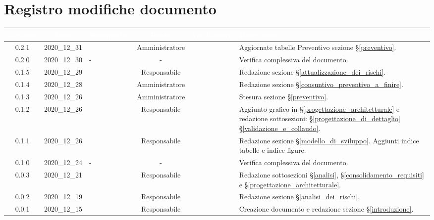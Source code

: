 \section*{Registro modifiche documento}
{

     
\renewcommand{\arraystretch}{1.5}
\centering
\begin{longtable}{c c C{3cm} c c C{3cm}}


 \textcolor{white}{\textbf{Versione}}&
    \textcolor{white}{\textbf{Data}}&
    \textcolor{white}{\textbf{Nominativo}}&
    \textcolor{white}{\textbf{Ruolo}}&
    \textcolor{white}{\textbf{Verificatore}}&
    \textcolor{white}{\textbf{Descrizione}}\\	
    \endhead

	0.2.1 & 2020\_12\_31 & \TG{} & Amministratore & \PC{} & Aggiornate tabelle Preventivo sezione \S\ref{preventivo}.\\
 
	0.2.0 & 2020\_12\_30 &  -  & - &  \TG{} & Verifica complessiva del documento.\\

    0.1.5 & 2020\_12\_29 & \MM{} & Responsabile & \TG{} & Redazione sezione \S\ref{attualizzazione_dei_rischi}. \\

    0.1.4 & 2020\_12\_28 & \PC{} & Amministratore & \TG{} &  Redazione sezione \S\ref{consuntivo_preventivo_a_finire}. \\

    0.1.3 & 2020\_12\_26 & \PC{} & Amministratore & \TG{} & Stesura sezione \S\ref{preventivo}. \\

    0.1.2 & 2020\_12\_26 & \MM{} & Responsabile & \TG{} & Aggiunto grafico in \S\ref{progettazione_architetturale} e redazione sottosezioni:  \S\ref{progettazione_di_dettaglio} \S\ref{validazione_e_collaudo}. \\

    0.1.1 & 2020\_12\_26 & \MM{} & Responsabile & \TG{} & Redazione sezione \S\ref{modello_di_sviluppo}. Aggiunti indice tabelle e indice figure. \\

    0.1.0 & 2020\_12\_24 & - & - & \PC{} & Verifica complessiva del documento.\\

    0.0.3 & 2020\_12\_21 & \MM{} & Responsabile &  \PC{} &Redazione sottosezioni \S\ref{analisi}, \S\ref{consolidamento_requisiti} e \S\ref{progettazione_architetturale}. \\

    0.0.2 & 2020\_12\_19 & \MM{} & Responsabile &  \PC{} & Redazione sezione \S\ref{analisi_dei_rischi}.\\

    0.0.1 & 2020\_12\_15 & \MM{} & Responsabile &  \PC{} & Creazione documento e redazione sezione \S\ref{introduzione}.
			
\end{longtable}
}